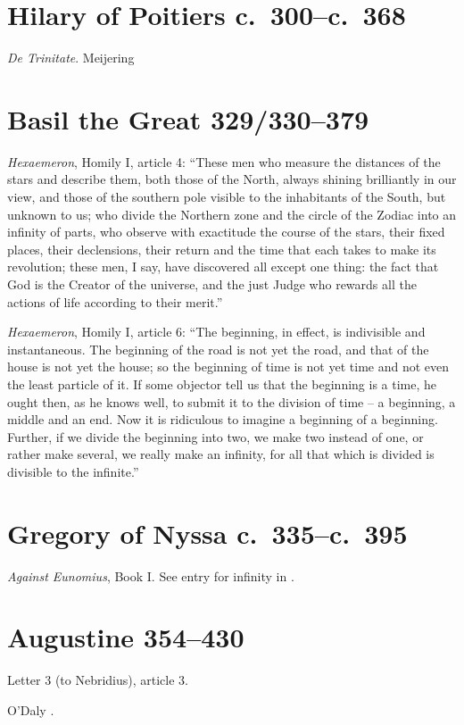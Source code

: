 \documentclass{amsart}
\theoremstyle{definition}
\begin{document}
\section{Hilary of Poitiers c.~300--c.~368}
{\em De Trinitate}. Meijering \cite{meijering}

\section{Basil the Great 329/330--379}
{\em Hexaemeron}, Homily I, article 4: ``These men who measure the distances of the stars and describe them, both those of the North, always shining brilliantly in our view, and those of the southern pole visible to the inhabitants of the South, but unknown to us; who divide the Northern zone and the circle of the Zodiac into an infinity of parts, who observe with exactitude the course of the stars, their fixed places, their declensions, their return and the time that each takes to make its revolution; these men, I say, have discovered all except one thing: the fact that God is the Creator of the universe, and the just Judge who rewards all the actions of life according to their merit.''

{\em Hexaemeron}, Homily I, article 6: ``The beginning, in effect, is indivisible and instantaneous. The beginning of the road is not yet the road, and that of the house is not yet the house; so the beginning of time is not yet time and not even the least particle of it. If some objector tell us that the beginning is a time, he ought then, as he knows well, to submit it to the division of time -- a beginning, a middle and an end. Now it is ridiculous to imagine a beginning of a beginning. Further, if we divide the beginning into two, we make two instead of one, or rather make several, we really make an infinity, for all that which is divided is divisible to the infinite.''



\section{Gregory of Nyssa c.~335--c.~395}
{\em Against Eunomius}, Book I. See entry for infinity in \cite{maspero}.


\section{Augustine 354--430}
Letter 3 (to Nebridius), article 3.

O'Daly \cite[p.~157]{odaly}.
\end{document}
